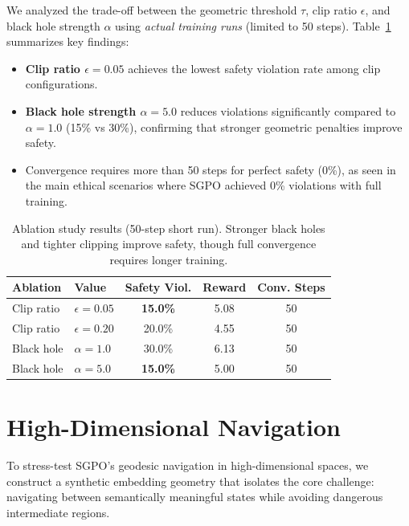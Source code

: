 We analyzed the trade-off between the geometric threshold $\tau$, clip ratio $\epsilon$, and black hole strength $\alpha$ using \emph{actual training runs} (limited to 50 steps). Table~\ref{tab:ablation_appendix} summarizes key findings:

\begin{itemize}
    \item \textbf{Clip ratio $\epsilon=0.05$} achieves the lowest safety violation rate among clip configurations.
    \item \textbf{Black hole strength $\alpha=5.0$} reduces violations significantly compared to $\alpha=1.0$ (15\% vs 30\%), confirming that stronger geometric penalties improve safety.
    \item Convergence requires more than 50 steps for perfect safety (0\%), as seen in the main ethical scenarios where SGPO achieved 0\% violations with full training.
\end{itemize}

\begin{table}[H]
\centering
\small
\caption{Ablation study results (50-step short run). Stronger black holes and tighter clipping improve safety, though full convergence requires longer training.}
\label{tab:ablation_appendix}
\begin{tabular}{@{}llccc@{}}
\toprule
\textbf{Ablation} & \textbf{Value} & \textbf{Safety Viol.} & \textbf{Reward} & \textbf{Conv. Steps} \\
\midrule
Clip ratio & $\epsilon=0.05$ & \textbf{15.0\%} & 5.08 & 50 \\
Clip ratio & $\epsilon=0.20$ & 20.0\% & 4.55 & 50 \\
Black hole & $\alpha=1.0$ & 30.0\% & 6.13 & 50 \\
Black hole & $\alpha=5.0$ & \textbf{15.0\%} & 5.00 & 50 \\
\bottomrule
\end{tabular}
\end{table}

\section{High-Dimensional Navigation}
\label{app:high_dim_navigation}

To stress-test SGPO's geodesic navigation in high-dimensional spaces, we construct a synthetic embedding geometry that isolates the core challenge: navigating between semantically meaningful states while avoiding dangerous intermediate regions.

